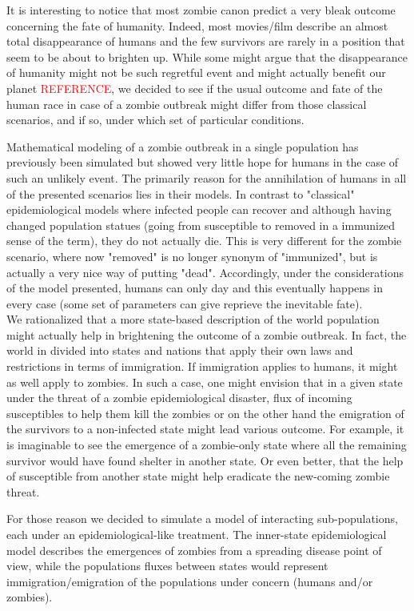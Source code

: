 \documentclass[11pt]{article}
\begin{document}
It is interesting to notice that most zombie canon predict a very bleak outcome concerning the fate of humanity. Indeed, most movies/film describe an almost total disappearance of humans and the few survivors are rarely in a position that seem to be about to brighten up. While some might argue that the disappearance of humanity might not be such regretful event and might actually benefit our planet \textcolor{red}{REFERENCE}, we decided to see if the usual outcome and fate of the human race in case of a zombie outbreak might differ from those classical scenarios, and if so, under which set of particular conditions. 

Mathematical modeling of a zombie outbreak in a single population has previously been simulated \cite{munz2009zombies} but showed very little hope for humans in the case of such an unlikely event. The primarily reason for the annihilation of humans in all of the presented scenarios lies in their models. In contrast to "classical" epidemiological models where infected people can recover and although having changed population statues (going from susceptible to removed in a immunized sense of the term), they do not actually die. This is very different for the zombie scenario, where now "removed" is no longer synonym of "immunized", but is actually a very nice way of putting "dead". Accordingly, under the considerations of the model presented, humans can only day and this eventually happens in every case (some set of parameters can give reprieve the inevitable fate).\\

We rationalized that a more state-based description of the world population might actually help in brightening the outcome of a zombie outbreak. In fact, the world in divided into states and nations that apply their own laws and restrictions in terms of immigration. If immigration applies to humans, it might as well apply to zombies. In such a case, one might envision that in a given state under the threat of a zombie epidemiological disaster, flux of incoming susceptibles to help them kill the zombies or on the other hand the emigration of the survivors to a non-infected state might lead various outcome. For example, it is imaginable to see the emergence of a zombie-only state where all the remaining survivor would have found shelter in another state. Or even better, that the help of susceptible from another state might help eradicate the new-coming zombie threat. 

For those reason we decided to simulate a model of interacting sub-populations, each under an epidemiological-like treatment. The inner-state epidemiological model describes the emergences of zombies from a spreading disease point of view, while the populations fluxes between states would represent immigration/emigration of the populations under concern (humans and/or zombies). 
\end{document}
